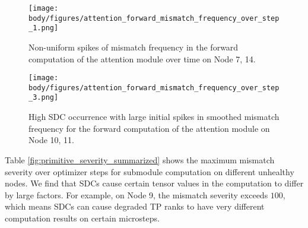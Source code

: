 \begin{figure}[t!]
    \centering
    \texttt{[image: body/figures/attention\_forward\_mismatch\_frequency\_over\_step\_1.png]}
    \vskip -0.15in
    \caption{Non-uniform spikes of mismatch frequency in the forward computation of the attention module over time on Node 7, 14.}
    \label{fig:attention_forward_mismatch_frequency_over_time}
\vskip -0.15in
\end{figure}

\begin{figure}[t]
    \vskip 0.1in
    \centering
    \texttt{[image: body/figures/attention\_forward\_mismatch\_frequency\_over\_step\_3.png]}
    \vskip -0.1in
    \caption{High SDC occurrence with large initial spikes in smoothed mismatch frequency for the forward computation of the attention module on Node 10, 11.}
    \label{fig:primitive_spike_at_beginning}
    \vskip -0.1in
\end{figure}

Table \ref{fig:primitive_severity_summarized}  shows the maximum mismatch severity over optimizer steps for submodule computation on different unhealthy nodes. We find that SDCs cause certain tensor values in the computation to differ by large factors. For example, on Node 9, the mismatch severity exceeds $100$, which means SDCs can cause degraded TP ranks to have very different computation results on certain microsteps.

